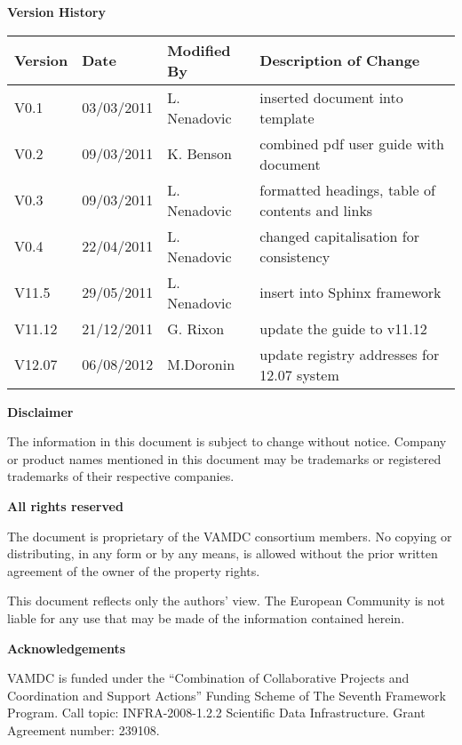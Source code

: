 {\begin{titlepage}
\end{titlepage}

\noindent \textbf{Version History}

\textbf{}

\noindent \begin{tabular}{|l|l|l|l|} 
\hline 
\textbf{Version} & \textbf{Date} & \textbf{Modified By} & \textbf{Description of Change} \\ \hline 
V0.1  & 03/03/2011 & L. Nenadovic  & inserted document into template \\ \hline 
V0.2  & 09/03/2011 & K. Benson & combined pdf user guide with document \\ \hline 
V0.3  & 09/03/2011 & L. Nenadovic & formatted headings, table of contents and links \\ \hline 
V0.4  & 22/04/2011 & L. Nenadovic & changed capitalisation for consistency \\ \hline 
V11.5 & 29/05/2011 & L. Nenadovic  & insert into Sphinx framework \\ \hline 
V11.12 & 21/12/2011 & G. Rixon  & update the guide to v11.12 \\ \hline
V12.07 & 06/08/2012 & M.Doronin  & update registry addresses for 12.07 system\\ \hline
\end{tabular}

\textbf{}

\noindent \textbf{Disclaimer}

\noindent The information in this document is subject to change without notice. Company or product names mentioned in this document may be trademarks or registered trademarks of their respective companies.


\textbf{}

\noindent \textbf{All rights reserved}

\noindent The document is proprietary of the VAMDC consortium members. No copying or distributing, in any form or by any means, is allowed without the prior written agreement of the owner of the property rights.

\noindent 

\noindent This document reflects only the authors' view. The European Community is not liable for any use that may be made of the information contained herein.

\textbf{}

\noindent \textbf{Acknowledgements}

\noindent VAMDC is funded under the ``Combination of Collaborative Projects and Coordination and  Support Actions'' Funding Scheme of The Seventh Framework Program. Call topic: INFRA-2008-1.2.2 Scientific Data Infrastructure. Grant Agreement number: 239108.

\textbf{}

}
